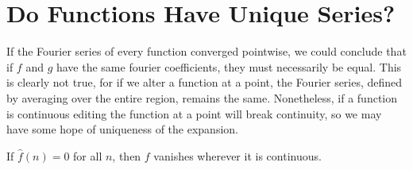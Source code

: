 \section{Do Functions Have Unique Series?}

If the Fourier series of every function converged pointwise, we could conclude that if $f$ and $g$ have the same fourier coefficients, they must necessarily be equal. This is clearly not true, for if we alter a function at a point, the Fourier series, defined by averaging over the entire region, remains the same. Nonetheless, if a function is continuous editing the function at a point will break continuity, so we may have some hope of uniqueness of the expansion.

\begin{theorem}
    If $\widehat{f}(n) = 0$ for all $n$, then $f$ vanishes wherever it is continuous.
\end{theorem}
